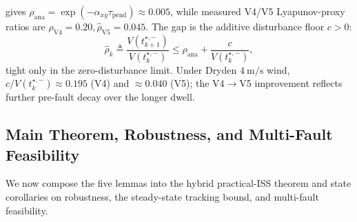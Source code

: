 \begin{remark}
\label{rem:rho-gap}
 gives $\rho_{\mathrm{ana}}=\exp(-\alpha_{xy}\tau_{\mathrm{pend}})\approx 0.005$, while measured V4/V5 Lyapunov-proxy ratios are $\hat\rho_{\mathrm{V4}}=0.20,\hat\rho_{\mathrm{V5}}=0.045$. The gap is the additive disturbance floor $c>0$:
\begin{equation}
  \hat\rho_k \triangleq
    \frac{V(t_{k+1}^{\star,-})}{V(t_k^{\star,-})}
    \le \rho_{\mathrm{ana}} + \frac{c}{V(t_k^{\star,-})},
  \label{eq:rho-hat-decomp}
\end{equation}
tight only in the zero-disturbance limit. Under Dryden $\SI{4}{\metre\per\second}$ wind, $c/V(t_k^{\star,-})\approx 0.195$ (V4) and $\approx 0.040$ (V5); the V4$\to$V5 improvement reflects further pre-fault decay over the longer dwell.
\end{remark}

\subsection{Main Theorem, Robustness, and Multi-Fault Feasibility}
\label{sec:main-theorem-and-robustness}

We now compose the five lemmas into the hybrid practical-ISS
theorem and state corollaries on robustness, the steady-state
tracking bound, and multi-fault feasibility.

